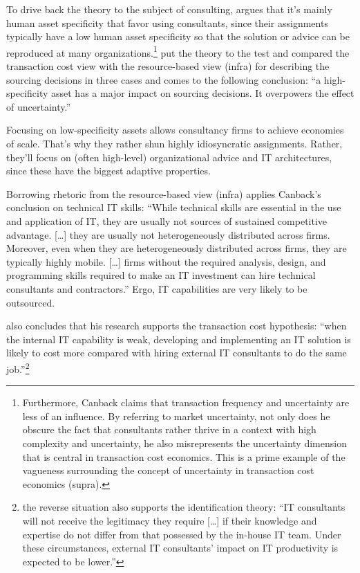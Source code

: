 \documentclass[12pt]{article}
\begin{document}
To drive back the theory to the subject of consulting,
\citet[37]{canback1998} argues that it's mainly human asset specificity
that favor using consultants, since their assignments typically have a
low human asset specificity so that the solution or advice can be
reproduced at many organizations.\footnote{Furthermore, Canback claims
  that transaction frequency and uncertainty are less of an influence.
  By referring to market uncertainty, not only does he obscure the fact
  that consultants rather thrive in a context with high complexity and
  uncertainty, he also misrepresents the uncertainty dimension that is
  central in transaction cost economics. This is a prime example of the
  vagueness surrounding the concept of uncertainty in transaction cost
  economics (supra).} \citet[408]{watjatrakul2005} put the theory to the
test and compared the transaction cost view with the resource-based view
(infra) for describing the sourcing decisions in three cases and comes
to the following conclusion: ``a high-specificity asset has a major
impact on sourcing decisions. It overpowers the effect of uncertainty.''

Focusing on low-specificity assets allows consultancy firms to achieve
economies of scale. That's why they rather shun highly idiosyncratic
assignments. Rather, they'll focus on (often high-level) organizational
advice and IT architectures, since these have the biggest adaptive
properties.

Borrowing rhetoric from the resource-based view (infra)
\citet[498]{mata1995} applies Canback's conclusion on technical IT
skills: ``While technical skills are essential in the use and
application of IT, they are usually not sources of sustained competitive
advantage. {[}\ldots{]} they are usually not heterogeneously distributed
across firms. Moreover, even when they are heterogeneously distributed
across firms, they are typically highly mobile. {[}\ldots{]} firms
without the required analysis, design, and programming skills required
to make an IT investment can hire technical consultants and
contractors.'' Ergo, IT capabilities are very likely to be outsourced.

\citet[16-17]{nevo2007} also concludes that his research supports the
transaction cost hypothesis: ``when the internal IT capability is weak,
developing and implementing an IT solution is likely to cost more
compared with hiring external IT consultants to do the same
job.''\footnote{the reverse situation also supports the identification
  theory: ``IT consultants will not receive the legitimacy they require
  {[}\ldots{]} if their knowledge and expertise do not differ from that
  possessed by the in-house IT team. Under these circumstances, external
  IT consultants' impact on IT productivity is expected to be lower.''}
\end{document}
